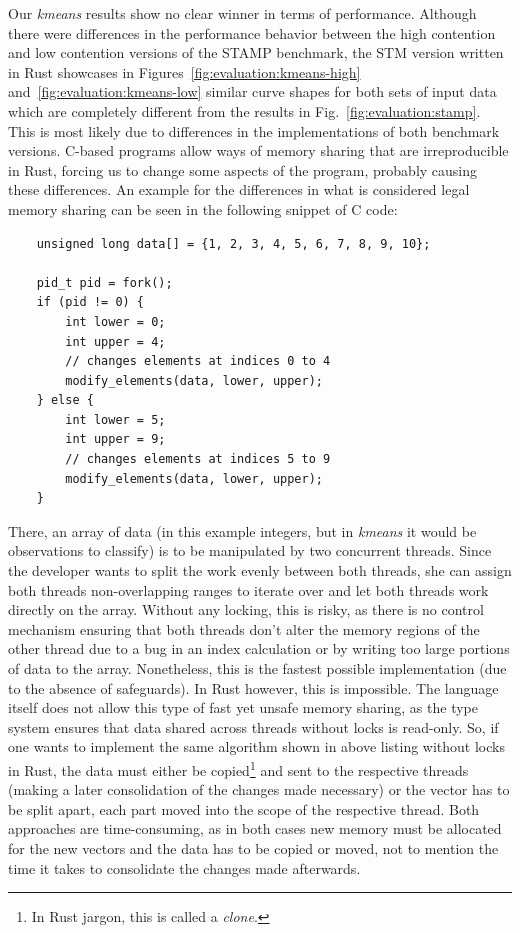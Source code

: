 Our \emph{kmeans} results show no clear winner in terms of performance.
Although there were differences in the performance behavior between the high contention and low contention versions of the STAMP benchmark, the STM version written in Rust showcases in Figures~\ref{fig:evaluation:kmeans-high} and~\ref{fig:evaluation:kmeans-low} similar curve shapes for both sets of input data which are completely different from the results in Fig.~\ref{fig:evaluation:stamp}.
This is most likely due to differences in the implementations of both benchmark versions.
C-based programs allow ways of memory sharing that are irreproducible in Rust, forcing us to change some aspects of the program, probably causing these differences.
An example for the differences in what is considered legal memory sharing can be seen in the following snippet of C code:
\begin{verbatim}
    unsigned long data[] = {1, 2, 3, 4, 5, 6, 7, 8, 9, 10};

    pid_t pid = fork();
    if (pid != 0) {
        int lower = 0;
        int upper = 4;
        // changes elements at indices 0 to 4
        modify_elements(data, lower, upper);
    } else {
        int lower = 5;
        int upper = 9;
        // changes elements at indices 5 to 9
        modify_elements(data, lower, upper);
    }
\end{verbatim}
There, an array of data (in this example integers, but in \emph{kmeans} it would be observations to classify) is to be manipulated by two concurrent threads.
Since the developer wants to split the work evenly between both threads, she can assign both threads non-overlapping ranges to iterate over and let both threads work directly on the array.
Without any locking, this is risky, as there is no control mechanism ensuring that both threads don't alter the memory regions of the other thread due to a bug in an index calculation or by writing too large portions of data to the array.
Nonetheless, this is the fastest possible implementation (due to the absence of safeguards).
In Rust however, this is impossible.
The language itself does not allow this type of fast yet unsafe memory sharing, as the type system ensures that data shared across threads without locks is read-only.
So, if one wants to implement the same algorithm shown in above listing without locks in Rust, the data must either be copied\footnote{In Rust jargon, this is called a \emph{clone}.} and sent to the respective threads (making a later consolidation of the changes made necessary) or the vector has to be split apart, each part moved into the scope of the respective thread.
Both approaches are time-consuming, as in both cases new memory must be allocated for the new vectors and the data has to be copied or moved, not to mention the time it takes to consolidate the changes made afterwards.

